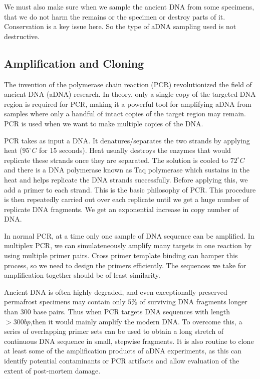 \documentclass[]{article}
\begin{document}
We must also make sure when we sample the ancient DNA from some
specimens, that we do not harm the remains or the specimen or destroy
parts of it. Conservation is a key issue here. So the type of aDNA
sampling used is not destructive.

\subsection{Amplification and Cloning}\label{amplification-and-cloning}

The invention of the polymerase chain reaction (PCR) revolutionized the
field of ancient DNA (aDNA) research. In theory, only a single copy of
the targeted DNA region is required for PCR, making it a powerful tool
for amplifying aDNA from samples where only a handful of intact copies
of the target region may remain. PCR is used when we want to make
multiple copies of the DNA.

PCR takes as input a DNA. It denatures/separates the two strands by
applying heat (\(95^{\circ} C\) for 15 seconds). Heat usually destroys
the enzymes that would replicate these strands once they are separated.
The solution is cooled to \(72^{\circ} C\) and there is a DNA polymerase
known as Taq polymerase which sustains in the heat and helps replicate
the DNA strands successfully. Before applying this, we add a primer to
each strand. This is the basic philosophy of PCR. This procedure is then
repeatedly carried out over each replicate until we get a huge number of
replicate DNA fragments. We get an exponential increase in copy number
of DNA.

In normal PCR, at a time only one sample of DNA sequence can be
amplified. In multiplex PCR, we can simulateneously amplify many targets
in one reaction by using multiple primer pairs. Cross primer template
binding can hamper this process, so we need to design the primers
efficiently. The sequences we take for amplification together should be
of least similarity.

Ancient DNA is often highly degraded, and even exceptionally preserved
permafrost specimens may contain only \(5\%\) of surviving DNA fragments
longer than 300 base pairs. Thus when PCR targets DNA sequences with
length \(> 300bp\),then it would mainly amplify the modern DNA. To
overcome this, a series of overlapping primer sets can be used to obtain
a long stretch of continuous DNA sequence in small, stepwise fragments.
It is also routine to clone at least some of the amplification products
of aDNA experiments, as this can identify potential contaminants or PCR
artifacts and allow evaluation of the extent of post-mortem damage.
\end{document}
